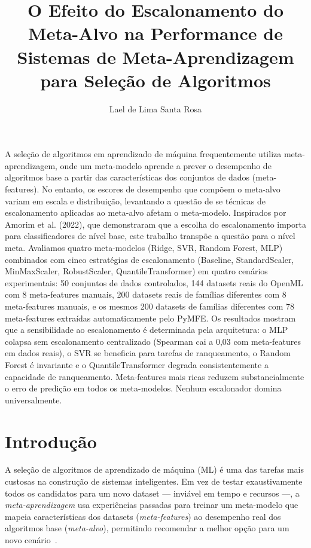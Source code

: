 \documentclass[12pt]{article}
\title{O Efeito do Escalonamento do Meta-Alvo na Performance de Sistemas de Meta-Aprendizagem para Seleção de Algoritmos}
\author{Lael de Lima Santa Rosa\inst{1}}
\begin{document}
\maketitle
\begin{resumo}
A seleção de algoritmos em aprendizado de máquina frequentemente utiliza meta-aprendizagem, onde um meta-modelo aprende a prever o desempenho de algoritmos base a partir das características dos conjuntos de dados (meta-features). No entanto, os escores de desempenho que compõem o meta-alvo variam em escala e distribuição, levantando a questão de se técnicas de escalonamento aplicadas ao meta-alvo afetam o meta-modelo. Inspirados por Amorim et al. (2022), que demonstraram que a escolha do escalonamento importa para classificadores de nível base, este trabalho transpõe a questão para o nível meta. Avaliamos quatro meta-modelos (Ridge, SVR, Random Forest, MLP) combinados com cinco estratégias de escalonamento (Baseline, StandardScaler, MinMaxScaler, RobustScaler, QuantileTransformer) em quatro cenários experimentais: 50 conjuntos de dados controlados, 144 datasets reais do OpenML com 8 meta-features manuais, 200 datasets reais de famílias diferentes com 8 meta-features manuais, e os mesmos 200 datasets de famílias diferentes com 78 meta-features extraídas automaticamente pelo PyMFE. Os resultados mostram que a sensibilidade ao escalonamento é determinada pela arquitetura: o MLP colapsa sem escalonamento centralizado (Spearman cai a 0,03 com meta-features em dados reais), o SVR se beneficia para tarefas de ranqueamento, o Random Forest é invariante e o QuantileTransformer degrada consistentemente a capacidade de ranqueamento. Meta-features mais ricas reduzem substancialmente o erro de predição em todos os meta-modelos. Nenhum escalonador domina universalmente.
\end{resumo}

\section{Introdução}

A seleção de algoritmos de aprendizado de máquina (ML) é uma das tarefas mais custosas na construção de sistemas inteligentes. Em vez de testar exaustivamente todos os candidatos para um novo dataset --- inviável em tempo e recursos ---, a \textit{meta-aprendizagem} usa experiências passadas para treinar um meta-modelo que mapeia características dos datasets (\textit{meta-features}) ao desempenho real dos algoritmos base (\textit{meta-alvo}), permitindo recomendar a melhor opção para um novo cenário~\cite{vanschoren2018meta}.
\end{document}
